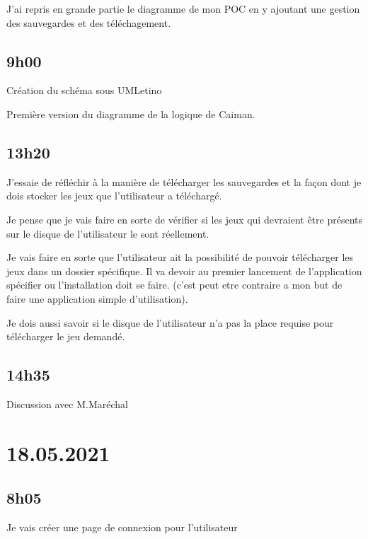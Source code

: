 \documentclass[a4paper,12pt,french]{sphinxmanual}
\begin{document}
\sphinxAtStartPar
J’ai repris en grande partie le diagramme de mon POC en y ajoutant une gestion des sauvegardes et des téléchagement.


\subsection{9h00}
\label{\detokenize{logbook:id120}}
\sphinxAtStartPar
Création du schéma sous UMLetino

\sphinxAtStartPar
Première version du diagramme de la logique de Caiman.


\subsection{13h20}
\label{\detokenize{logbook:id121}}
\sphinxAtStartPar
J’essaie de réfléchir à la manière de télécharger les sauvegardes et la façon dont je dois stocker les jeux que l’utilisateur a téléchargé.

\sphinxAtStartPar
Je pense que je vais faire en sorte de vérifier si les jeux qui devraient être présents sur le disque de l’utilisateur le sont réellement.

\sphinxAtStartPar
Je vais faire en sorte que l’utilisateur ait la possibilité de pouvoir télécharger les jeux dans un dossier spécifique. Il va devoir au premier lancement de l’application spécifier ou l’installation doit se faire. (c’est peut etre contraire a mon but de faire une application simple d’utilisation).

\sphinxAtStartPar
Je dois aussi savoir si le disque de l’utilisateur n’a pas la place requise pour télécharger le jeu demandé.


\subsection{14h35}
\label{\detokenize{logbook:id122}}
\sphinxAtStartPar
Discussion avec M.Maréchal


\section{18.05.2021}
\label{\detokenize{logbook:id123}}

\subsection{8h05}
\label{\detokenize{logbook:id124}}
\sphinxAtStartPar
Je vais créer une page de connexion pour l’utilisateur
\end{document}

